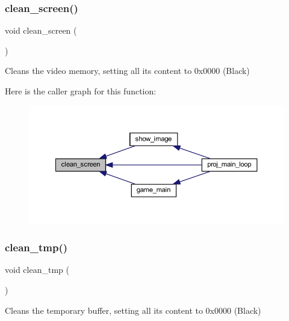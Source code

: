 \subsubsection{\texorpdfstring{clean\+\_\+screen()}{clean\_screen()}}
{\footnotesize\ttfamily void clean\+\_\+screen (\begin{DoxyParamCaption}{ }\end{DoxyParamCaption})}



Cleans the video memory, setting all its content to 0x0000 (Black) 

Here is the caller graph for this function\+:
\nopagebreak
\begin{figure}[H]
\begin{center}
\leavevmode
\includegraphics[width=350pt]{group__videog_ga0d199b5702695c4d7b78ef83759c32d5_icgraph}
\end{center}
\end{figure}
\mbox{\label{group__videog_ga330b56594412c06fcf7c605709352a19}} 
\subsubsection{\texorpdfstring{clean\+\_\+tmp()}{clean\_tmp()}}
{\footnotesize\ttfamily void clean\+\_\+tmp (\begin{DoxyParamCaption}{ }\end{DoxyParamCaption})}



Cleans the temporary buffer, setting all its content to 0x0000 (Black) 

